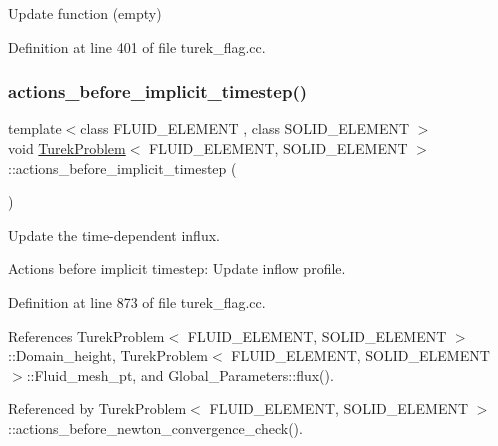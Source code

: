 Update function (empty) 



Definition at line 401 of file turek\+\_\+flag.\+cc.

\mbox{\label{classTurekProblem_a4ad226ceec27cb3c3ea4d1ecfd4e573f}} 
\subsubsection{\texorpdfstring{actions\+\_\+before\+\_\+implicit\+\_\+timestep()}{actions\_before\_implicit\_timestep()}}
{\footnotesize\ttfamily template$<$class F\+L\+U\+I\+D\+\_\+\+E\+L\+E\+M\+E\+NT , class S\+O\+L\+I\+D\+\_\+\+E\+L\+E\+M\+E\+NT $>$ \\
void \hyperlink{classTurekProblem}{Turek\+Problem}$<$ F\+L\+U\+I\+D\+\_\+\+E\+L\+E\+M\+E\+NT, S\+O\+L\+I\+D\+\_\+\+E\+L\+E\+M\+E\+NT $>$\+::actions\+\_\+before\+\_\+implicit\+\_\+timestep (\begin{DoxyParamCaption}{ }\end{DoxyParamCaption})}



Update the time-\/dependent influx. 

Actions before implicit timestep\+: Update inflow profile. 

Definition at line 873 of file turek\+\_\+flag.\+cc.



References Turek\+Problem$<$ F\+L\+U\+I\+D\+\_\+\+E\+L\+E\+M\+E\+N\+T, S\+O\+L\+I\+D\+\_\+\+E\+L\+E\+M\+E\+N\+T $>$\+::\+Domain\+\_\+height, Turek\+Problem$<$ F\+L\+U\+I\+D\+\_\+\+E\+L\+E\+M\+E\+N\+T, S\+O\+L\+I\+D\+\_\+\+E\+L\+E\+M\+E\+N\+T $>$\+::\+Fluid\+\_\+mesh\+\_\+pt, and Global\+\_\+\+Parameters\+::flux().



Referenced by Turek\+Problem$<$ F\+L\+U\+I\+D\+\_\+\+E\+L\+E\+M\+E\+N\+T, S\+O\+L\+I\+D\+\_\+\+E\+L\+E\+M\+E\+N\+T $>$\+::actions\+\_\+before\+\_\+newton\+\_\+convergence\+\_\+check().

\mbox{\label{classTurekProblem_aa896171b1a817ca35cba9b723bb15ed2}} 

